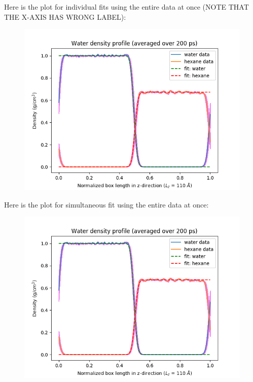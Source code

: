 \documentclass[12pt,reqno]{amsart}
\numberwithin{equation}{section}
\begin{document}
\begin{enumerate}
Here is the plot for individual fits using the entire data at once (NOTE THAT THE X-AXIS HAS WRONG LABEL):

\begin{figure}[H]
\centering
\includegraphics[scale=0.6]{interface_density_profile_individualfit_trueNVT}
\end{figure}

Here is the plot for simultaneous fit using the entire data at once:

\begin{figure}[H]
\centering
\includegraphics[scale=0.6]{interface_density_profile_simultaneousfit_trueNVT}
\end{figure}


\end{enumerate}
\end{document}
